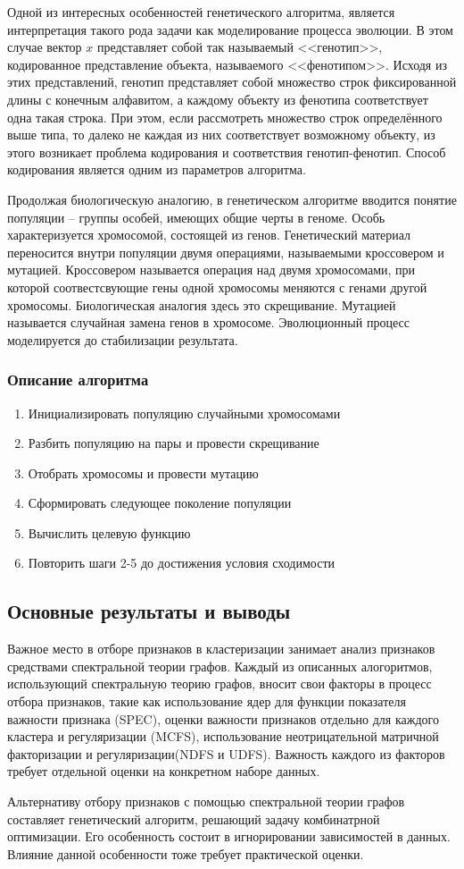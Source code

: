 Одной из интересных особенностей генетического алгоритма, является интерпретация такого рода задачи как моделирование процесса эволюции. В этом случае вектор $x$ представляет собой так называемый <<генотип>>, кодированное представление объекта, называемого <<фенотипом>>. Исходя из этих представлений, генотип представляет собой множество строк фиксированной длины с конечным алфавитом, а каждому объекту из фенотипа соответствует одна такая строка. При этом, если рассмотреть множество строк определённого выше типа, то далеко не каждая из них соответствует возможному объекту, из этого возникает проблема кодирования и соответствия генотип-фенотип. Способ кодирования является одним из параметров алгоритма.

Продолжая биологическую аналогию, в генетическом алгоритме вводится понятие популяции -- группы особей, имеющих общие черты в геноме. Особь характеризуется хромосомой, состоящей из генов. Генетический материал переносится внутри популяции двумя операциями, называемыми кроссовером и мутацией. Кроссовером называется операция над двумя хромосомами, при которой соотвестсвующие гены одной хромосомы меняются с генами другой хромосомы. Биологическая аналогия здесь это скрещивание. Мутацией называется случайная замена генов в хромосоме. Эволюционный процесс моделируется до стабилизации результата.
\subsubsection{Описание алгоритма}
\begin{enumerate}
	\item Инициализировать популяцию случайными хромосомами
	\item Разбить популяцию на пары и провести скрещивание
	\item Отобрать хромосомы и провести мутацию
	\item Сформировать следующее поколение популяции
	\item Вычислить целевую функцию
	\item Повторить шаги 2-5 до достижения условия сходимости
\end{enumerate}
\subsection{Основные результаты и выводы}
Важное место в отборе признаков в кластеризации занимает анализ признаков средствами спектральной теории графов. Каждый из описанных алогоритмов, использующий спектральную теорию графов, вносит свои факторы в процесс отбора признаков, такие как использование ядер для функции показателя важности признака (SPEC), оценки важности признаков отдельно для каждого кластера и регуляризации (MCFS), использование неотрицательной матричной факторизации и регуляризации(NDFS и UDFS). Важность каждого из факторов требует отдельной оценки на конкретном наборе данных.

Альтернативу отбору признаков с помощью спектральной теории графов составляет генетический алгоритм, решающий задачу комбинатрной оптимизации. Его особенность состоит в игнорировании зависимостей в данных. Влияние данной особенности тоже требует практической оценки.